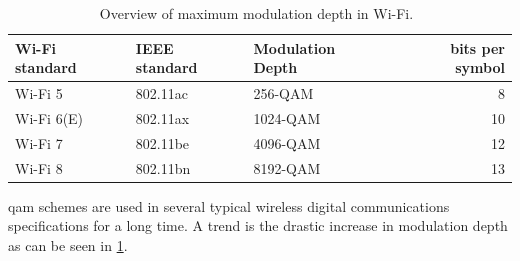 \begin{table}[hbtp]
    \centering
    \scriptsize
    \caption{Overview of maximum modulation depth in Wi-Fi.~\cite{enwiki:1210657347}}
    \label{tab:wifi-qam}
\renewcommand\arraystretch{1.6}
    \begin{tabular}{l l l r}
    \toprule
    Wi-Fi standard & IEEE standard & Modulation Depth & bits per symbol\\
    \midrule
    Wi-Fi 5 & 802.11ac   &  256-QAM& 8\\
    Wi-Fi 6(E) & 802.11ax   &  1024-QAM & 10\\
    Wi-Fi 7 & 802.11be   &  4096-QAM &12\\
    Wi-Fi 8 & 802.11bn   &  8192-QAM &13\\
    \bottomrule
    \end{tabular}
    
\end{table}
\Gls{qam} schemes are used in several typical wireless digital communications specifications for a long time. A trend is the drastic increase in modulation depth as can be seen in \cref{tab:wifi-qam}.
